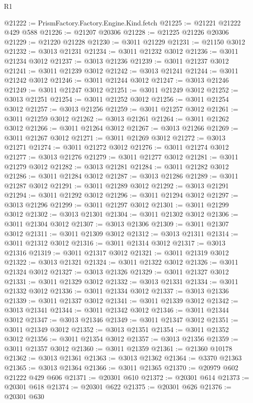 \begin{lexlean}{R1}
\begin{coremodule}
@21222 := PrismFactory.Factory.Engine.Kind.fetch
@21225 := @21221 @21222 @429 @588
@21226 := @21207 @20306
@21228 := @21225 @21226 @20306
@21229 := @21220 @21228
@21230 := @3011 @21229
@21231 := @21150 @3012
@21232 := @3013 @21231
@21234 := @3011 @21232 @3012
@21236 := @3011 @21234 @3012
@21237 := @3013 @21236
@21239 := @3011 @21237 @3012
@21241 := @3011 @21239 @3012
@21242 := @3013 @21241
@21244 := @3011 @21242 @3012
@21246 := @3011 @21244 @3012
@21247 := @3013 @21246
@21249 := @3011 @21247 @3012
@21251 := @3011 @21249 @3012
@21252 := @3013 @21251
@21254 := @3011 @21252 @3012
@21256 := @3011 @21254 @3012
@21257 := @3013 @21256
@21259 := @3011 @21257 @3012
@21261 := @3011 @21259 @3012
@21262 := @3013 @21261
@21264 := @3011 @21262 @3012
@21266 := @3011 @21264 @3012
@21267 := @3013 @21266
@21269 := @3011 @21267 @3012
@21271 := @3011 @21269 @3012
@21272 := @3013 @21271
@21274 := @3011 @21272 @3012
@21276 := @3011 @21274 @3012
@21277 := @3013 @21276
@21279 := @3011 @21277 @3012
@21281 := @3011 @21279 @3012
@21282 := @3013 @21281
@21284 := @3011 @21282 @3012
@21286 := @3011 @21284 @3012
@21287 := @3013 @21286
@21289 := @3011 @21287 @3012
@21291 := @3011 @21289 @3012
@21292 := @3013 @21291
@21294 := @3011 @21292 @3012
@21296 := @3011 @21294 @3012
@21297 := @3013 @21296
@21299 := @3011 @21297 @3012
@21301 := @3011 @21299 @3012
@21302 := @3013 @21301
@21304 := @3011 @21302 @3012
@21306 := @3011 @21304 @3012
@21307 := @3013 @21306
@21309 := @3011 @21307 @3012
@21311 := @3011 @21309 @3012
@21312 := @3013 @21311
@21314 := @3011 @21312 @3012
@21316 := @3011 @21314 @3012
@21317 := @3013 @21316
@21319 := @3011 @21317 @3012
@21321 := @3011 @21319 @3012
@21322 := @3013 @21321
@21324 := @3011 @21322 @3012
@21326 := @3011 @21324 @3012
@21327 := @3013 @21326
@21329 := @3011 @21327 @3012
@21331 := @3011 @21329 @3012
@21332 := @3013 @21331
@21334 := @3011 @21332 @3012
@21336 := @3011 @21334 @3012
@21337 := @3013 @21336
@21339 := @3011 @21337 @3012
@21341 := @3011 @21339 @3012
@21342 := @3013 @21341
@21344 := @3011 @21342 @3012
@21346 := @3011 @21344 @3012
@21347 := @3013 @21346
@21349 := @3011 @21347 @3012
@21351 := @3011 @21349 @3012
@21352 := @3013 @21351
@21354 := @3011 @21352 @3012
@21356 := @3011 @21354 @3012
@21357 := @3013 @21356
@21359 := @3011 @21357 @3012
@21360 := @3011 @21359
@21361 := @21360 @10178
@21362 := @3013 @21361
@21363 := @3013 @21362
@21364 := @3370 @21363
@21365 := @3013 @21364
@21366 := @3011 @21365
@21370 := @20979 @602 @21222 @429 @606
@21371 := @20301 @610
@21372 := @20301 @614
@21373 := @20301 @618
@21374 := @20301 @622
@21375 := @20301 @626
@21376 := @20301 @630

\end{coremodule}
\end{lexlean}
